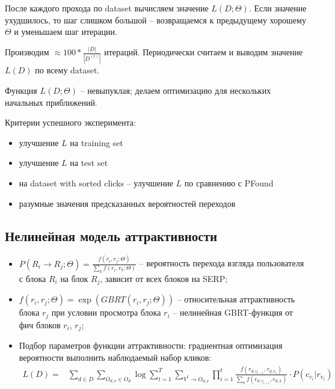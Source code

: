 \documentclass[12pt,a4paper]{article}
\begin{document}

После каждого прохода по dataset вычисляем значение $L(D; \Theta)$. Если значение ухудшилось, то шаг слишком большой -- возвращаемся к предыдущему хорошему $\Theta$ и уменьшаем шаг итерации.

Производим $\approx 100 * \frac{|D|}{|D^{(t)}|}$ итераций. Периодически считаем и выводим значение $L(D)$ по всему dataset.

Функция $L(D; \Theta)$ -- невыпуклая; делаем оптимизацию для нескольких начальных приближений.


Критерии успешного эксперимента:
\begin{itemize}
 \item улучшение $L$ на training set
 \item улучшение $L$ на test set
 \item на dataset with sorted clicks -- улучшение $L$ по сравнению с PFound
 \item разумные значения предсказанных вероятностей переходов
\end{itemize}

\subsection{Нелинейная модель аттрактивности}

\begin{itemize}
 \item $P(R_i \to R_j; \Theta) = \frac{f(r_i, r_j; \Theta)}{\sum_k f(r_i, r_k; \Theta)}$ -- вероятность перехода взгляда пользователя с блока $R_i$ на блок $R_j$, зависит от всех блоков на SERP;
 \item $f(r_i, r_j; \Theta)=\exp\left(GBRT(r_i, r_j; \Theta)\right)$ -- относительная аттрактивность блока $r_j$ при условии просмотра блока $r_i$ -- нелинейная GBRT-функция от фич блоков $r_i$, $r_j$;
 \item Подбор параметров функции аттрактивности: градиентная оптимизация вероятности выполнить наблюдаемый набор кликов:
\begin{align*}
L(D) = & \sum_{d \in D} \sum_{O_{d,\nu} \in O_d}
  \log \sum_{t=1}^T \sum_{V^t \to O_{d,\nu}} \prod_{i=1}^t
     \frac{f(r_{d,v_{i-1}}, r_{d,v_i})}{\sum_k f(r_{d,v_{i-1}}, r_{d,k})}  \cdot P(c_{v_i} | r_{v_i})
\end{align*}
\end{itemize}
\end{document}

